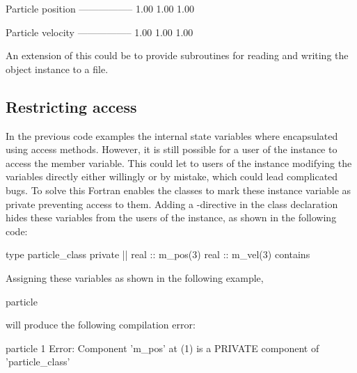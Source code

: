 \cmdmode

\begin{fortrancodeenv}
 Particle position
 -----------------
  1.00      1.00      1.00    
 
 Particle velocity
 -----------------
  1.00      1.00      1.00    
\end{fortrancodeenv}

An extension of this could be to provide subroutines for reading and writing the object instance to a file.

\subsection{Restricting access}

In the previous code examples the internal state variables where encapsulated using access methods. However, it is still possible for a user of the instance to access the member variable. This could let to users of the instance modifying the variables directly either willingly or by mistake, which could lead complicated bugs. To solve this Fortran enables the classes to mark these instance variable as private preventing access to them. Adding a -directive in the class declaration hides these variables from the users of the instance, as shown in the following code:

\fmode

\begin{fortrancodeenv}
type particle_class
private |\hladded|
    real :: m_pos(3)
    real :: m_vel(3)
contains
\end{fortrancodeenv}

Assigning these variables as shown in the following example,

\begin{fortrancodeenv}
particle %
\end{fortrancodeenv}

will produce the following compilation error:

\cmdmode

\begin{fortrancodeenv}
    particle %
                  1
Error: Component 'm_pos' at (1) is a PRIVATE component of 'particle_class'
\end{fortrancodeenv}

\fmode

